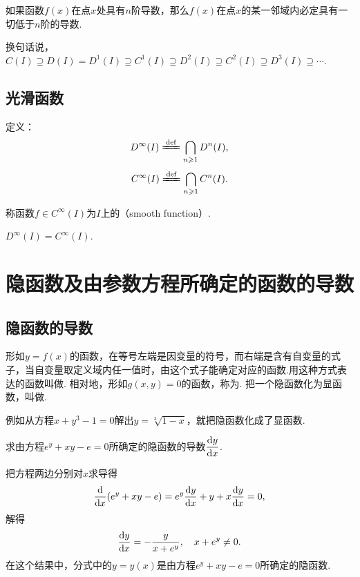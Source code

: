 \begin{theorem}
如果函数\(f(x)\)在点\(x\)处具有\(n\)阶导数，那么\(f(x)\)在点\(x\)的某一邻域内必定具有一切低于\(n\)阶的导数.
\end{theorem}
换句话说，\(
C(I) \supseteq
D(I) = D^1(I) \supseteq
C^1(I) \supseteq
D^2(I) \supseteq
C^2(I) \supseteq
D^3(I) \supseteq
\dotsb
\).

\subsection{光滑函数}
\begin{definition}\label{definition:函数族.光滑函数族}
定义：\[
D^\infty (I) \defeq \bigcap\limits_{n\geqslant1} D^n(I),
\]\[
C^\infty (I) \defeq \bigcap\limits_{n\geqslant1} C^n(I).
\]

称函数\(f \in C^\infty (I)\)为\(I\)上的（smooth function）.
\end{definition}

\begin{property}\label{theorem:函数族.光滑函数族的性质1}
\(D^\infty (I) = C^\infty (I)\).
\end{property}

\section{隐函数及由参数方程所确定的函数的导数}\label{section:导数与微分.隐函数及由参数方程所确定的函数的导数}
\subsection{隐函数的导数}
\begin{definition}
形如\(y=f(x)\)的函数，在等号左端是因变量的符号，而右端是含有自变量的式子，当自变量取定义域内任一值时，由这个式子能确定对应的函数.用这种方式表达的函数叫做.
相对地，形如\(g(x,y)=0\)的函数，称为.
把一个隐函数化为显函数，叫做.
\end{definition}

\begin{example}
例如从方程\(x+y^3-1=0\)解出\(y=\sqrt[3]{1-x}\)，就把隐函数化成了显函数.
\end{example}

\begin{example}
求由方程\(e^y + xy - e = 0\)所确定的隐函数的导数\(\displaystyle\dv{y}{x}\).
\begin{solution}
把方程两边分别对\(x\)求导得\[
\dv{x}(e^y+xy-e) = e^y \dv{y}{x} + y + x \dv{y}{x} = 0,
\]解得\[
\dv{y}{x} = -\frac{y}{x+e^y},
\quad x+e^y \neq 0.
\]在这个结果中，分式中的\(y=y(x)\)是由方程\(e^y + xy - e = 0\)所确定的隐函数.
\end{solution}
\end{example}

